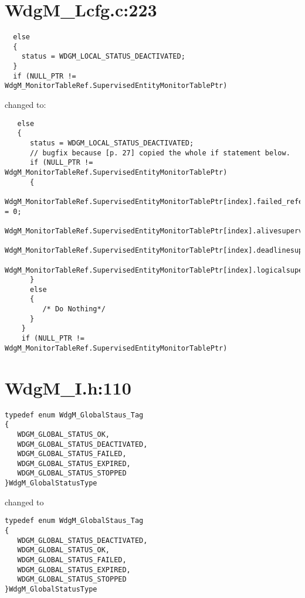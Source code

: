 \documentclass[11pt,a4paper]{article}
\begin{document}
\section{WdgM\_Lcfg.c:223}
\begin{lstlisting}
  else
  {
    status = WDGM_LOCAL_STATUS_DEACTIVATED;
  }
  if (NULL_PTR != WdgM_MonitorTableRef.SupervisedEntityMonitorTablePtr)
\end{lstlisting}
changed to:
\begin{lstlisting}
   else
   {
      status = WDGM_LOCAL_STATUS_DEACTIVATED;
      // bugfix because [p. 27] copied the whole if statement below.
      if (NULL_PTR != WdgM_MonitorTableRef.SupervisedEntityMonitorTablePtr)
      {
         WdgM_MonitorTableRef.SupervisedEntityMonitorTablePtr[index].failed_reference_supervisioncycles = 0;
         WdgM_MonitorTableRef.SupervisedEntityMonitorTablePtr[index].alivesupervision_result=WDGM_CORRECT;
         WdgM_MonitorTableRef.SupervisedEntityMonitorTablePtr[index].deadlinesupervision_result=WDGM_CORRECT;
         WdgM_MonitorTableRef.SupervisedEntityMonitorTablePtr[index].logicalsupervision_result=WDGM_CORRECT;
      }
      else
      {
         /* Do Nothing*/
      }
    }
    if (NULL_PTR != WdgM_MonitorTableRef.SupervisedEntityMonitorTablePtr)
\end{lstlisting}

\newpage
\section{WdgM\_I.h:110}
\begin{lstlisting}
typedef enum WdgM_GlobalStaus_Tag
{
   WDGM_GLOBAL_STATUS_OK,
   WDGM_GLOBAL_STATUS_DEACTIVATED,
   WDGM_GLOBAL_STATUS_FAILED,
   WDGM_GLOBAL_STATUS_EXPIRED,
   WDGM_GLOBAL_STATUS_STOPPED
}WdgM_GlobalStatusType
\end{lstlisting}
changed to
\begin{lstlisting}
typedef enum WdgM_GlobalStaus_Tag
{
   WDGM_GLOBAL_STATUS_DEACTIVATED,
   WDGM_GLOBAL_STATUS_OK,
   WDGM_GLOBAL_STATUS_FAILED,
   WDGM_GLOBAL_STATUS_EXPIRED,
   WDGM_GLOBAL_STATUS_STOPPED
}WdgM_GlobalStatusType
\end{lstlisting}
\end{document}
